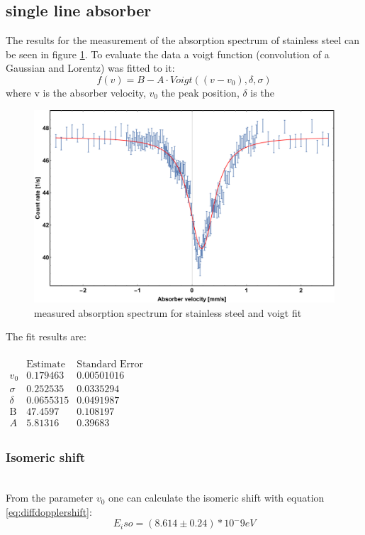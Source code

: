  \subsection{single line absorber}
 The results for the measurement of the absorption spectrum of stainless steel can be seen in figure \ref{fig:single line absorber:fitresult}. To evaluate the data a voigt function (convolution of a Gaussian and Lorentz) was fitted to it:
 \begin{equation}
 f(v)=B- A \cdot Voigt((v-v_0),\delta,\sigma )
 \end{equation}
 where v is the absorber velocity, $v_0$ the peak position, $\delta$ is the 
\begin{figure}[H]
\centering
\includegraphics[width=0.7\linewidth]{../results/steel/voigtfittry.pdf}
\caption[stainless steel spectrum]{measured absorption spectrum for stainless steel and voigt fit}
\label{fig:single line absorber:fitresult}
\end{figure}
The fit results are:\\ \ \\
$\begin{array}{l|llll}
\text{} & \text{Estimate} & \text{Standard Error} \\
\hline
v_0 & 0.179463 & 0.00501016\\
\sigma  & 0.252535 & 0.0335294 \\
\delta  & 0.0655315 & 0.0491987\\
\text{B} & 47.4597 & 0.108197\\
A & 5.81316 & 0.39683 &\\
\end{array}$

\subsubsection{Isomeric shift} \ \\
From the parameter $v_0$ one can calculate the isomeric shift with equation \ref{eq:diffdopplershift}:
\begin{equation}
E_iso = (8.614\pm0.24)*10^-9 eV
\end{equation}
